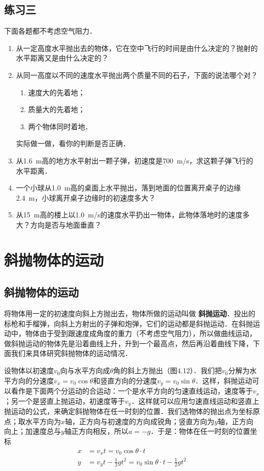 \subsection*{练习三}

下面各题都不考虑空气阻力．
\begin{enumerate}
    \item 从一定高度水平抛出去的物体，它在空中飞行的时间是由什么决定的？抛射的水平距离又是由什么决定的？
    \item 从同一高度以不同的速度水平抛出两个质量不同的石子，下面的说法哪个对？
          \begin{enumerate}
              \item 速度大的先着地；
              \item  质量大的先着地；
              \item 两个物体同时着地．
          \end{enumerate}
          实际做一做，看你的判断是否正确．

    \item 从\SI{1.6}{m}高的地方水平射出一颗子弹，初速度是\SI{700}{m/s}，求这颗子弹飞行的水平距离．
    \item 一个小球从\SI{1.0}{m}高的桌面上水平抛出，落到地面的位置离开桌子的边缘\SI{2.4}{m}，小球离开桌子边缘时的初速度多大？
    \item 从\SI{15}{m}高的楼上以\SI{1.0}{m/s}的速度水平扔出一物体，此物体落地时的速度多大？方向是否与地面垂直？
\end{enumerate}

\newpage
\section{斜抛物体的运动}

\subsection{斜抛物体的运动}

将物体用一定的初速度向斜上方抛出去，物体所做的运动叫做\textbf{ 斜抛运动}．投出的标枪和手榴弹，向斜上方射出的子弹和炮弹，它们的运动都是斜抛运动．在斜抛运动中，物体由于受到跟速度成角度的重力（不考虑空气阻力），所以做曲线运动，做斜抛运动的物体先是沿着曲线上升，升到一个最高点，然后再沿着曲线下降，下面我们来具体研究斜抛物体的运动情况．

设物体以初速度$v_0$向与水平方向成$\theta$角的斜上方抛出（图4.12）．我们把$v_0$分解为水平方向的分速度$v_x=v_0\cos\theta$和竖直方向的分速度$v_y=v_0\sin\theta$．这样，斜抛运动可以看作是下面两个分运动的合运动：一个是水平方向的匀速直线运动，速度等于$v_x$；另一个是竖直上抛运动，初速度等于$v_y$．这样就可以应用匀速直线运动和竖直上抛运动的公式，来确定斜抛物体在任一时刻的位置．我们选物体的抛出点为坐标原
点；取水平方向为$x$轴，正方向与初速度的方向成锐角；竖直方向为$y$轴，正方向向上；加速度总与$y$轴正方向相反，所以$a=-g$．于是：物体在任一时刻的位置坐标
\begin{align}
    x & =v_x t=v_0\cos\theta \cdot t                                 \\
    y & =v_y t-\frac{1}{2}gt^2=v_0\sin\theta \cdot t-\frac{1}{2}gt^2
\end{align}

